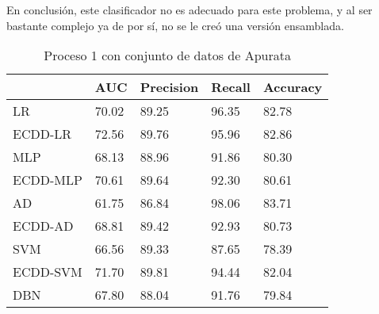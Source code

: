 En conclusión, este clasificador no es adecuado para este problema, y al ser bastante complejo ya de por sí, no se le creó una versión ensamblada.


\begin{table}[]
\centering
\caption{Proceso 1 con conjunto de datos de Apurata}
\label{tab:apurata-proc1}
\begin{tabularx}{0.75\textwidth}{|l|Y Y Y Y|}
                \hline
                & AUC       & Precision & Recall    & Accuracy  \\
                \hline
LR              & 70.02     & 89.25     & 96.35     & 82.78     \\
ECDD-LR           & 72.56     & 89.76     & 95.96     & 82.86     \\
                \hline
MLP             & 68.13     & 88.96     & 91.86     & 80.30     \\
ECDD-MLP          & 70.61     & 89.64     & 92.30     & 80.61     \\
                \hline
AD              & 61.75     & 86.84     & 98.06     & 83.71     \\
ECDD-AD           & 68.81     & 89.42     & 92.93     & 80.73     \\
                \hline
SVM             & 66.56     & 89.33     & 87.65     & 78.39     \\
ECDD-SVM          & 71.70     & 89.81     & 94.44     & 82.04     \\
                \hline
DBN             & 67.80     & 88.04     & 91.76     & 79.84     \\
                \hline
\end{tabularx}
\end{table}


